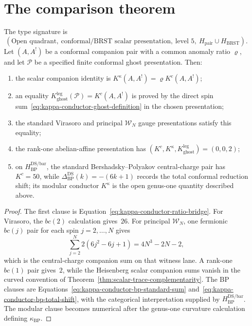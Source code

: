 \section{The comparison theorem}
\label{sec:trinity-theorem}

\begin{theorem}
\label{thm:conductor-trinity}
\ClaimStatusConditional
The type signature is
\[
 (\text{Open quadrant},\ \text{conformal/BRST scalar presentation},\
 \text{level }5,\ H_{\mathrm{pair}}\cup H_{\mathrm{BRST}}).
\]
Let $(A,A^!)$ be a conformal companion pair with a common anomaly ratio
$\varrho$, and let $\mathcal P$ be a specified finite conformal ghost
presentation.  Then:
\begin{enumerate}
\item the scalar companion identity is
$K^\kappa(A,A^!)=\varrho K^c(A,A^!)$;
\item an equality
$K_{\mathrm{ghost}}^{\mathrm{leg}}(\mathcal P)=K^c(A,A^!)$
is proved by the direct spin sum~\eqref{eq:kappa-conductor-ghost-definition}
in the chosen presentation;
\item the standard Virasoro and principal $\mathcal W_N$ gauge
presentations satisfy this equality;
\item the rank-one abelian-affine presentation has
$(K^c,K^\kappa,K_{\mathrm{ghost}}^{\mathrm{leg}})=(0,0,2)$;
\item on $H_{\mathrm{BP}}^{\mathrm{DS/bar}}$, the standard
Bershadsky--Polyakov central-charge pair has $K^c=50$, while
$\Delta^{\mathrm{DS}}_{\mathrm{BP}}(k)=-(6k+1)$ records the total
conformal reduction shift; its modular conductor $K^\kappa$ is the open
genus-one quantity described above.
\end{enumerate}
\end{theorem}

\begin{proof}
The first clause is Equation~\eqref{eq:kappa-conductor-ratio-bridge}.
For Virasoro, the $bc(2)$ calculation gives~$26$.  For principal
$\mathcal W_N$, one fermionic $bc(j)$ pair for each spin
$j=2,\ldots,N$ gives
\[
 \sum_{j=2}^{N}2(6j^2-6j+1)=4N^3-2N-2,
\]
which is the central-charge companion sum on that witness lane.  A
rank-one $bc(1)$ pair gives~$2$, while the Heisenberg scalar companion
sums vanish in the curved convention of
Theorem~\ref{thm:scalar-trace-complementarity}.  The BP
clauses are Equations~\eqref{eq:kappa-conductor-bp-standard-sum}
and~\eqref{eq:kappa-conductor-bp-total-shift}, with the categorical
interpretation supplied by $H_{\mathrm{BP}}^{\mathrm{DS/bar}}$.  The
modular clause becomes numerical after the genus-one curvature
calculation defining $\kappa_{\mathrm{BP}}$.
\end{proof}

